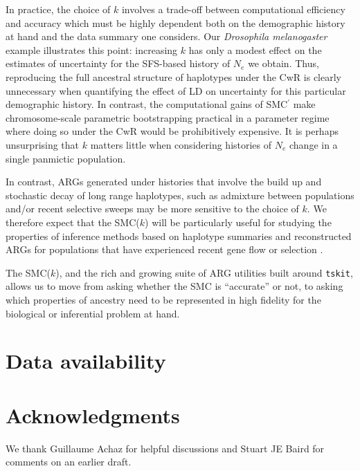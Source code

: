 \documentclass[9pt,twocolumn,twoside,lineno]{gsajnl}
\begin{document}
In practice, the choice of $k$ involves a trade-off between computational efficiency and accuracy which must be highly dependent both on the demographic history at hand and the data summary one considers. Our \emph{Drosophila melanogaster} example illustrates this point: increasing $k$ has only a modest effect on the estimates of uncertainty for the SFS-based history of $N_e$ we obtain. Thus, reproducing the full ancestral structure of haplotypes under the CwR is clearly unnecessary when quantifying the effect of LD on uncertainty for this particular demographic history. In contrast, the computational gains of SMC$^\prime$ make chromosome-scale parametric bootstrapping practical in a parameter regime where doing so under the CwR would be prohibitively expensive. It is perhaps unsurprising that $k$ matters little when considering histories of $N_e$ change in a single panmictic population.

In contrast, ARGs generated under histories that involve the build up and stochastic decay of long range haplotypes, such as admixture between populations and/or recent selective sweeps may be more sensitive to the choice of $k$. We therefore expect that the SMC($k$) will be particularly useful for studying the properties of inference methods based on haplotype summaries and reconstructed ARGs for populations that have experienced recent gene flow or selection \citep{zhang2026recovering}.

The SMC($k$), and the rich and growing suite of ARG utilities built
around \texttt{tskit}, allows us to move from asking whether the SMC is ``accurate'' or not, to asking which properties of ancestry need to be represented in high fidelity for the biological or inferential problem at hand.


\section{Data availability}

\section{Acknowledgments}
We thank Guillaume Achaz for helpful discussions and Stuart JE Baird for comments on an earlier draft.
\end{document}
